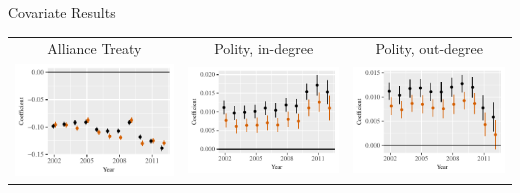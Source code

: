 \documentclass{beamer}
\begin{document}
\begin{frame}{Covariate Results}
\begin{tabular}{c@{\hskip -.4cm}c@{\hskip -.4cm}c}
\small{Alliance Treaty} & \small{Polity, in-degree} & \small{Polity, out-degree} \\ 
\includegraphics[height=.3\textheight, clip=true, trim=.5cm .5cm 0cm .1cm]{slides_figures/rl_plots/Alliance.pdf} 
 &
\includegraphics[height=.3\textheight, clip=true, trim=.5cm .5cm 0cm .1cm]{slides_figures/rl_plots/Polity_in.pdf}   &
\includegraphics[height=.3\textheight, clip=true, trim=.5cm .5cm 0cm .1cm]{slides_figures/rl_plots/Polity_out.pdf} \\  
\end{tabular}


\end{frame}
\end{document}
